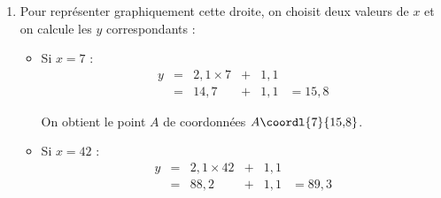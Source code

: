 \begin{methode}
\begin{correction}
\begin{enumerate}
\begin{enumerate}
\begin{enumerate}
					            \item \textbf{Avec une calculatrice CASIO :}
					                  \begin{itemize}
						                  \item Ouvrir le menu .
						                  \item Saisir les valeurs de $x_i$ dans  et les valeurs de $y_i$ dans .
						                  \item Sélectionner  (touche ) puis  (touche ).
						                  \item Choisir  pour  et  pour , puis valider par .
						                  \item Sélectionner  (touche ), puis  (touche ) et  (touche ).
					                  \end{itemize}
				            \end{enumerate}

				            On obtient :
				            \[
					            a \approx 2{,}138\ldots \quad \text{et} \quad b \approx 1{,}143\ldots
				            \]

				            Une équation de la droite d'ajustement est : $\quad y = 2{,}1x + 1{,}1$
				      \item Pour représenter graphiquement cette droite, on choisit deux valeurs de $x$ et on calcule les $y$ correspondants :
				            \begin{itemize}
					            \item Si $x = 7$ :
					                  \[
						                  \begin{array}{rccccl}
							                  y & = & 2{,}1 \times 7 & + & 1{,}1            \\
							                    & = & 14{,}7         & + & 1{,}1 & = 15{,}8
						                  \end{array}
					                  \]

					                  On obtient le point $A$ de coordonnées $A\coordl{7}{15{,}8}$.
					            \item Si $x = 42$ :
					                  \[
						                  \begin{array}{rccccl}
							                  y & = & 2{,}1 \times 42 & + & 1{,}1 &          \\
							                    & = & 88{,}2          & + & 1{,}1 & = 89{,}3
						                  \end{array}
					                  \]


\end{itemize}
\end{enumerate}
\end{enumerate}
\end{correction}
\end{methode}

